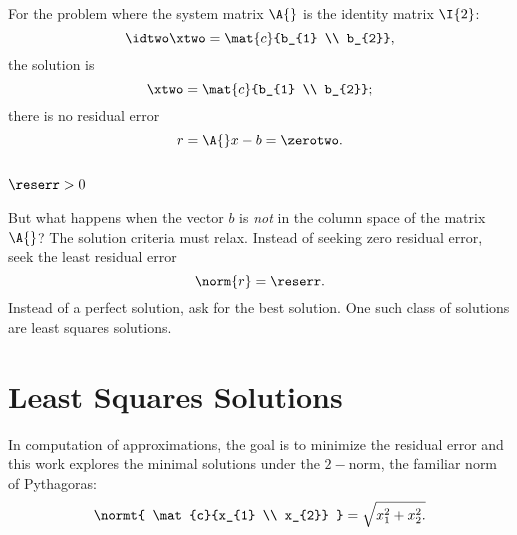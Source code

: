 For the problem where the system matrix $\A{}$ is the identity matrix $\I{2}$:
  \begin{equation*}   %
      \idtwo \xtwo = \mat{c}{b_{1} \\ b_{2}},
  \end{equation*}
the solution is
  \begin{equation*}   %
      \xtwo = \mat{c}{b_{1} \\ b_{2}} ;
  \end{equation*}
there is no residual error 
  \begin{equation*}   %
      r = \A{} x - b = \zerotwo .
  \end{equation*}

\subsection{$\reserr > 0$}  %
But what happens when the vector $b$ is \emph{not} in the column space of the matrix $\A{}$? The solution criteria must relax. Instead of seeking zero residual error, seek the least residual error
  \begin{equation*}   %
      \norm{r} = \reserr.
  \end{equation*}
Instead of a perfect solution, ask for the best solution. One such class of solutions are least squares solutions.

\section{Least Squares Solutions}  %
In computation of approximations, the goal is to minimize the residual error and this work explores the minimal solutions under the $2-$norm, the familiar norm of Pythagoras:
  \begin{equation*}   %
      \normt{ \mat{c}{x_{1} \\ x_{2}} } = \sqrt{x_{1}^{2} + x_{2}^{2}.}
  \end{equation*}


